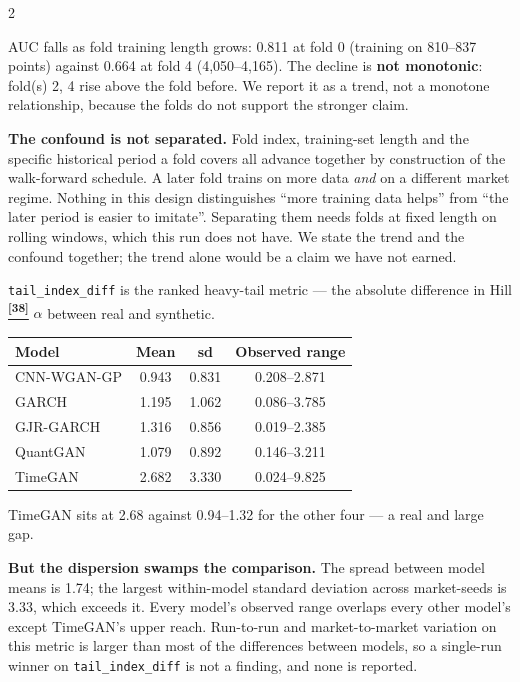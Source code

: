 \documentclass[10pt]{article}
\newcommand{\tealbox}[2]{\begin{tcolorbox}[mybox={Teal}{LBg},title={#1}]#2\end{tcolorbox}}
\newcommand{\tcite}[1]{%
  \hyperlink{R:#1}{\textsuperscript{\scriptsize\textbf{[#1]}}}}
\begin{document}
\begin{multicols}{2}
{\smallskip
AUC falls as fold training length grows: 0.811 at fold 0 (training on 810--837 points) against 0.664 at fold 4 (4,050--4,165). The decline is \textbf{not monotonic}: fold(s) 2, 4 rise above the fold before. We report it as a trend, not a monotone relationship, because the folds do not support the stronger claim.

\smallskip
\textbf{The confound is not separated.} Fold index, training-set length and the specific historical period a fold covers all advance together by construction of the walk-forward schedule. A later fold trains on more data \emph{and} on a different market regime. Nothing in this design distinguishes ``more training data helps'' from ``the later period is easier to imitate''. Separating them needs folds at fixed length on rolling windows, which this run does not have. We state the trend and the confound together; the trend alone would be a claim we have not earned.}

\columnbreak

\tealbox{Tail-Index Dispersion (Table~6)}{%
\texttt{tail\_index\_diff} is the ranked heavy-tail metric --- the absolute difference in Hill\tcite{38} $\hat\alpha$ between real and synthetic.

\smallskip
\begin{tabular}{@{}lccc@{}}
\toprule
Model & Mean & sd & Observed range \\
\midrule
CNN-WGAN-GP & 0.943 & 0.831 & 0.208--2.871 \\
GARCH & 1.195 & 1.062 & 0.086--3.785 \\
GJR-GARCH & 1.316 & 0.856 & 0.019--2.385 \\
QuantGAN & 1.079 & 0.892 & 0.146--3.211 \\
TimeGAN & 2.682 & 3.330 & 0.024--9.825 \\
\bottomrule
\end{tabular}

\smallskip
TimeGAN sits at 2.68 against 0.94--1.32 for the other four --- a real and large gap.

\smallskip
\textbf{But the dispersion swamps the comparison.} The spread between model means is 1.74; the largest within-model standard deviation across market-seeds is 3.33, which exceeds it. Every model's observed range overlaps every other model's except TimeGAN's upper reach. Run-to-run and market-to-market variation on this metric is larger than most of the differences between models, so a single-run winner on \texttt{tail\_index\_diff} is not a finding, and none is reported.}


\end{multicols}
\end{document}
